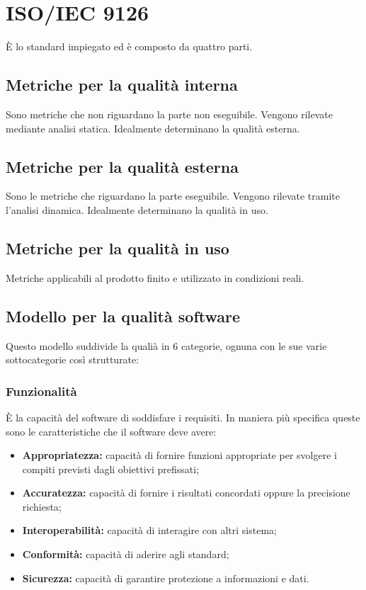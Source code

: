 \label{sec:A}
\section{ISO/IEC 9126}
È lo standard impiegato ed è composto da quattro parti.
\subsection{Metriche per la qualità interna}
Sono metriche che non riguardano la parte non eseguibile. Vengono rilevate mediante analisi statica. Idealmente determinano la qualità esterna.
\subsection{Metriche per la qualità esterna}
Sono le metriche che riguardano la parte eseguibile. Vengono rilevate tramite l'analisi dinamica. Idealmente determinano la qualità in uso.
\subsection{Metriche per la qualità in uso}
Metriche applicabili al prodotto finito e utilizzato in condizioni reali.
\subsection{Modello per la qualità software}
Questo modello suddivide la qualià in 6 categorie, ognuna con le sue varie sottocategorie così strutturate:
\subsubsection{Funzionalità}
È la capacità del software di soddisfare i requisiti. In maniera più specifica queste sono le caratteristiche che il software deve avere:
\begin{itemize}
    \item \textbf{Appropriatezza:} capacità di fornire funzioni appropriate per svolgere i compiti previsti dagli obiettivi prefissati;
    \item \textbf{Accuratezza:} capacità di fornire i risultati concordati oppure la precisione richiesta;
    \item \textbf{Interoperabilità:} capacità  di interagire con altri sistema;
    \item \textbf{Conformità:} capacità di aderire agli standard;
    \item \textbf{Sicurezza:} capacità di garantire protezione a informazioni e dati.
\end{itemize}
